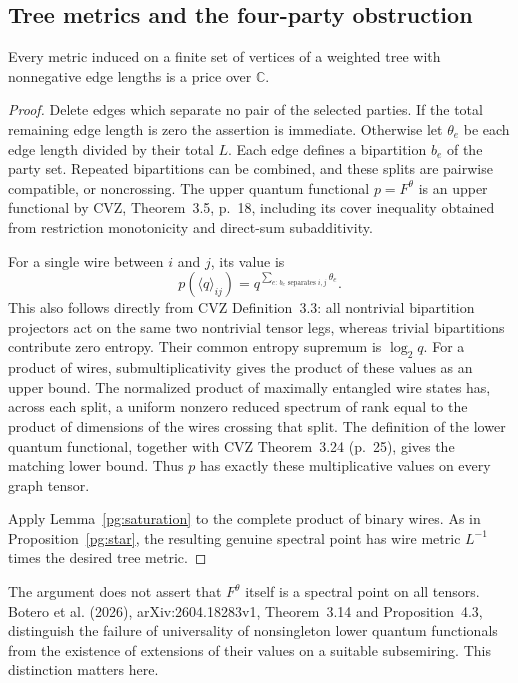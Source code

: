 \subsection{Tree metrics and the four-party obstruction}

\begin{proposition}
\label{pg:tree}
Every metric induced on a finite set of vertices of a weighted tree with
nonnegative edge lengths is a price over $\mathbb C$.
\end{proposition}
\begin{proof}
Delete edges which separate no pair of the selected parties. If the total
remaining edge length is zero the assertion is immediate. Otherwise let
$\theta_e$ be each edge length divided by their total $L$. Each edge
defines a bipartition $b_e$ of the party set. Repeated bipartitions can be
combined, and these splits are pairwise compatible, or noncrossing.
The upper quantum functional $p=F^\theta$ is an upper functional by CVZ,
Theorem~3.5, p.~18, including its cover inequality obtained from restriction
monotonicity and direct-sum subadditivity.

For a single wire between $i$ and $j$, its value is
\[
 p(\langle q\rangle_{ij})=q^{\sum_{e:\,b_e\text{ separates }i,j}\theta_e}.
\]
This also follows directly from CVZ Definition~3.3: all nontrivial bipartition
projectors act on the same two nontrivial tensor legs, whereas trivial
bipartitions contribute zero entropy. Their common entropy supremum is
$\log_2 q$. For a product of wires, submultiplicativity gives the product
of these values as an upper bound. The normalized product of maximally
entangled wire states has, across each split, a uniform nonzero reduced
spectrum of rank equal to the product of dimensions of the wires crossing
that split. The definition of the lower quantum functional, together with
CVZ Theorem~3.24 (p.~25), gives the matching lower bound. Thus $p$ has
exactly these multiplicative values on every graph tensor.

Apply Lemma~\ref{pg:saturation} to the complete product of binary wires.
As in Proposition~\ref{pg:star}, the resulting genuine spectral point has
wire metric $L^{-1}$ times the desired tree metric.
\end{proof}

The argument does not assert that $F^\theta$ itself is a spectral point on
all tensors. Botero et al. (2026), arXiv:2604.18283v1, Theorem~3.14 and
Proposition~4.3, distinguish the failure of universality of nonsingleton
lower quantum functionals from the existence of extensions of their values
on a suitable subsemiring. This distinction matters here.

